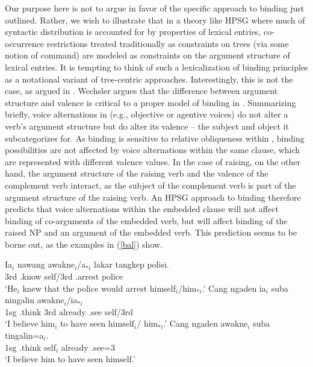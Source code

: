 \documentclass[output=paper
 	        ,biblatex
                ,babelshorthands
                ,newtxmath
                ,draftmode
                ,colorlinks, citecolor=brown
]{langscibook}
\begin{document}
Our purpose here is not to argue in favor of the specific approach to binding just outlined. Rather, we wish to illustrate that in a theory like HPSG where much of syntactic distribution is accounted for by properties of lexical entries, co-occurrence restrictions treated traditionally as constraints on trees (via some notion of command) are modeled as constraints on the argument structure of lexical entries. It is tempting to think of such a lexicalization of binding principles as a notational variant of tree-centric approaches. Interestingly, this is not the case, as argued in . Wechsler argues that the difference between argument structure and valence is critical to a proper model of binding in . Summarizing briefly, voice alternations in   (e.g., objective or agentive voices) do not alter a verb's argument structure but do alter its valence -- the subject and object it subcategorizes for. As binding is sensitive to relative obliqueness within , binding possibilities are not affected by voice alternations within the same clause, which are represented with different valence values. In the case of raising, on the other hand, the argument structure of the raising verb and the valence of the complement verb interact, as the subject of the complement verb is part of the argument structure of the raising verb. An HPSG approach to binding therefore predicts that voice alternations within the embedded clause will not affect binding of co-arguments of the embedded verb, but will affect binding of the raised NP and an argument of the embedded verb. This prediction seems to be borne out, as the  examples in (\ref{bal}) show. 

\begin{exe}
	\ex\label{bal}
	\begin{xlist} 
		\ex\label{bal-a}
		\gll Ia$_{i}$ nawang {awakne$_{i}$/a$_{*i}$ } lakar tangkep polisi. \\
		3rd .know self/3rd  .arrest police  \\
		\glt `He$_{i}$ knew that the police would arrest himself$_{i}$/him$_{*i}$.'
		\ex\label{bal-b}
		\gll Cang ngaden ia$_{i}$ suba ningalin awakne$_{i}$/ia$_{*i}$ \\
		1sg .think 3rd already .see self/3rd \\
		\glt `I believe him$_{i}$ to have seen himself$_{i}$/ him$_{*i}$.'
		\ex\label{bal-c}
		\gll Cang ngaden awakne$_{i}$ suba tingalin=a$_{i}$.\\
		1sg .think self$_{i}$ already .see=3 \\
		\glt `I believe him to have seen himself.'
	\end{xlist}
\end{exe} 
\end{document}
